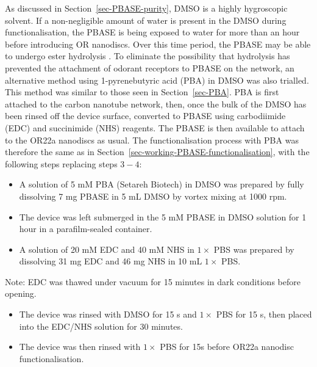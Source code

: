 \documentclass[
  a4paper,
]{scrbook}
\begin{document}
As discussed in Section~\ref{sec-PBASE-purity}, DMSO is a highly
hygroscopic solvent. If a non-negligible amount of water is present in
the DMSO during functionalisation, the PBASE is being exposed to water
for more than an hour before introducing OR nanodiscs. Over this time
period, the PBASE may be able to undergo ester hydrolysis
\autocite{Hermanson2013-3}. To eliminate the possibility that hydrolysis
has prevented the attachment of odorant receptors to PBASE on the
network, an alternative method using 1-pyrenebutyric acid (PBA) in DMSO
was also trialled. This method was similar to those seen in
Section~\ref{sec-PBA}. PBA is first attached to the carbon nanotube
network, then, once the bulk of the DMSO has been rinsed off the device
surface, converted to PBASE using carbodiimide (EDC) and succinimide
(NHS) reagents. The PBASE is then available to attach to the OR22a
nanodiscs as usual. The functionalisation process with PBA was therefore
the same as in Section~\ref{sec-working-PBASE-functionalisation}, with
the following steps replacing steps \(3-4\):

\begin{itemize}
\item
  A solution of 5 mM PBA (Setareh Biotech) in DMSO was prepared by fully
  dissolving 7 mg PBASE in 5 mL DMSO by vortex mixing at 1000 rpm.
\item
  The device was left submerged in the 5 mM PBASE in DMSO solution for 1
  hour in a parafilm-sealed container.
\item
  A solution of 20 mM EDC and 40 mM NHS in \(1 \times\) PBS was prepared
  by dissolving 31 mg EDC and 46 mg NHS in 10 mL \(1 \times\) PBS.
\end{itemize}

Note: EDC was thawed under vacuum for 15 minutes in dark conditions
before opening.

\begin{itemize}
\item
  The device was rinsed with DMSO for 15 s and \(1 \times\) PBS for 15
  s, then placed into the EDC/NHS solution for 30 minutes.
\item
  The device was then rinsed with \(1 \times\) PBS for 15s before OR22a
  nanodisc functionalisation.
\end{itemize}
\end{document}
